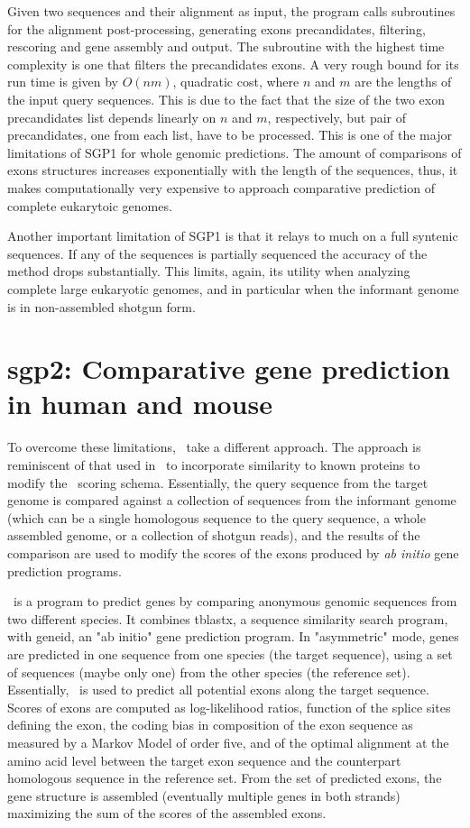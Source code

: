 Given two sequences and their alignment as input, the program calls
subroutines for the alignment post-processing, generating exons
precandidates, filtering, rescoring and gene assembly and output. The
subroutine with the highest time complexity is one that filters the
precandidates exons. A very rough bound for its run time is given by
$O(nm)$, quadratic cost, where $n$ and $m$ are the lengths of the
input query sequences. This is due to the fact that the size of the
two exon precandidates list depends linearly on $n$ and $m$,
respectively, but pair of precandidates, one from each list, have to
be processed. This is one of the major limitations of SGP1 for whole
genomic predictions. The amount of comparisons of exons structures
increases exponentially with the length of the sequences, thus, it
makes computationally very expensive to approach comparative prediction
of complete eukarytoic genomes.

Another important limitation of SGP1 is that it relays to much on a
full syntenic sequences. If any of the sequences is partially sequenced
the accuracy of the method drops substantially. This limits, again, its
utility when analyzing complete large eukaryotic genomes, and in
particular when the informant genome is in non-assembled shotgun form.

\section{sgp2: Comparative gene prediction in human and mouse}

To overcome these limitations, \sgp\ take a different approach. The
approach is reminiscent of that used in \genomescan\ to incorporate
similarity to known proteins to modify the \genscan\ scoring
schema. Essentially, the query sequence from the target genome is
compared against a collection of sequences from the informant genome
(which can be a single homologous sequence to the query sequence, a
whole assembled genome, or a collection of shotgun reads), and the
results of the comparison are used to modify the scores of the exons
produced by \textit{ab initio} gene prediction programs.


\sgp\ is a program to predict genes by comparing anonymous genomic
sequences from two different species. It combines tblastx, a sequence
similarity search program, with geneid, an "ab initio" gene prediction
program. In "asymmetric" mode, genes are predicted in one sequence
from one species (the target sequence), using a set of sequences
(maybe only one) from the other species (the reference set).
Essentially, \geneid\ is used to predict all potential exons along the
target sequence. Scores of exons are computed as log-likelihood
ratios, function of the splice sites defining the exon, the coding
bias in composition of the exon sequence as measured by a Markov Model
of order five, and of the optimal alignment at the amino acid level
between the target exon sequence and the counterpart homologous
sequence in the reference set. From the set of predicted exons, the
gene structure is assembled (eventually multiple genes in both
strands) maximizing the sum of the scores of the assembled exons.

